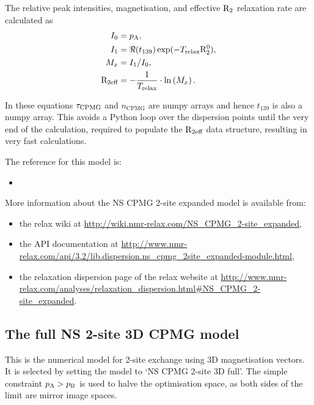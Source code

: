 The relative peak intensities, magnetisation, and effective $\mathrm{R}_2$ relaxation rate are calculated as
\begin{subequations}
\begin{align}
    I_0 &= p_{\textrm{A}}, \\
    I_1 &= \Re(t_{139}) \exp(-T_{\textrm{relax}} \mathrm{R}_2^0), \\
    M_x &= I_1 / I_0, \\
    \mathrm{R}_{\textrm{2eff}} &= -\frac{1}{T_{\textrm{relax}}} \cdot \ln \left( M_x \right). \label{eq: R2eff NS CPMG 2-site expanded}
\end{align}
\end{subequations}

In these equations $\tau_{\textrm{CPMG}}$ and $n_{\textrm{CPMG}}$ are numpy arrays and hence $t_{139}$ is also a numpy array.
This avoids a Python loop over the dispersion points until the very end of the calculation, required to populate the $\mathrm{R}_{\textrm{2eff}}$ data structure, resulting in very fast calculations.

The reference for this model is:
\begin{itemize}
  \item {}
\end{itemize}

More information about the NS CPMG 2-site expanded model is available from:
\begin{itemize}
  \item the relax wiki at \url{http://wiki.nmr-relax.com/NS\_CPMG\_2-site\_expanded},
  \item the API documentation at \url{http://www.nmr-relax.com/api/3.2/lib.dispersion.ns\_cpmg\_2site\_expanded-module.html},
  \item the relaxation dispersion page of the relax website at \url{http://www.nmr-relax.com/analyses/relaxation\_dispersion.html#NS\_CPMG\_2-site\_expanded}.
\end{itemize}



\subsection{The full NS 2-site 3D CPMG model}
\label{sect: dispersion: NS CPMG 2-site 3D full model}

This is the numerical model for 2-site exchange using 3D magnetisation vectors.
It is selected by setting the model to `NS CPMG 2-site 3D full'.
The simple constraint $p_{\textrm{A}} > p_{\textrm{B}}$ is used to halve the optimisation space, as both sides of the limit are mirror image spaces.


